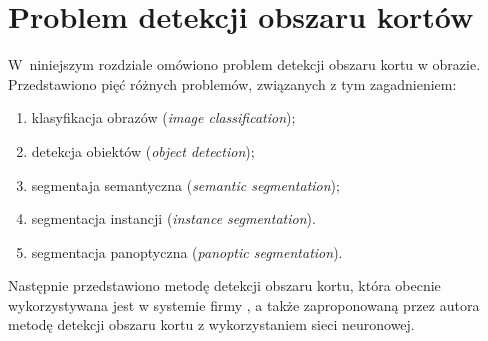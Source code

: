 \chapter{Problem detekcji obszaru kortów}

W~niniejszym rozdziale omówiono problem detekcji obszaru kortu w obrazie.
Przedstawiono pięć różnych problemów, związanych z tym zagadnieniem:
\begin{enumerate}
  \item klasyfikacja obrazów (\textit{image classification});
  \item detekcja obiektów (\textit{object detection});
  \item segmentaja semantyczna (\textit{semantic segmentation});
  \item segmentacja instancji (\textit{instance segmentation}).
  \item segmentacja panoptyczna (\textit{panoptic segmentation}).
\end{enumerate}
Następnie przedstawiono metodę detekcji obszaru kortu, która obecnie wykorzystywana jest w systemie firmy \blue{}, a także zaproponowaną przez autora metodę detekcji obszaru kortu z wykorzystaniem sieci neuronowej.
